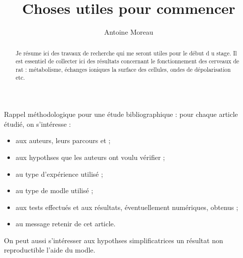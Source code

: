 \documentclass[a4paper,12pt]{article}
\title{Choses utiles pour commencer}
\author{Antoine Moreau}
\begin{document}

\maketitle

\begin{abstract}
Je r\'esume ici des travaux de recherche qui me seront utiles pour le d\'ebut d u stage. %
Il est essentiel de collecter ici des résultats concernant le fonctionnement des cerveaux de rat : %
m\'etabolisme, \'echanges ioniques  la surface des cellules, ondes de d\'epolarisation etc.
\end{abstract}

Rappel m\'ethodologique pour une \'etude bibliographique : pour chaque article \'etudi\'e, on s'int\'eresse :

\begin{itemize}
\item aux auteurs, leurs parcours et ;
\item aux hypothses que les auteurs ont voulu v\'erifier ;
\item au type d'exp\'erience utilis\'e ;
\item au type de modle utilis\'e ;
\item aux tests effectu\'es et aux r\'esultats, \'eventuellement num\'eriques, obtenus ;
\item au message  retenir de cet article.
\end{itemize}

On peut aussi s'int\'eresser aux hypothses simplificatrices  un r\'esultat non reproductible  l'aide du modle.

\newpage

\newpage

\newpage








\newpage


\end{document}
